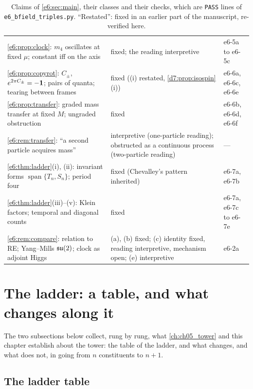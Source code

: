 \begin{table}[htbp]
\begin{tabular}{@{}>{\raggedright\arraybackslash}p{8.0cm}>{\raggedright\arraybackslash}p{4.7cm}>{\raggedright\arraybackslash}p{2.1cm}@{}}
\cref{e6:prop:clock}: $m_4$ oscillates at fixed $\mu$; constant iff on the axis & fixed; the reading interpretive & e6-5a to e6-5c\\
\cref{e6:prop:copyrot}: $C_\pm$, $e^{2\pi C_\pm}=-\mathbf 1$; pairs of quanta; tearing between frames & fixed ((i) restated, \cref{d7:prop:isospin}(i)) & e6-6a, e6-6c, e6-6e\\
\cref{e6:prop:transfer}: graded mass transfer at fixed $M$; ungraded obstruction & fixed & e6-6b, e6-6d, e6-6f\\
\cref{e6:rem:transfer}: ``a second particle acquires mass'' & interpretive (one-particle reading); obstructed as a continuous process (two-particle reading) & ---\\
\cref{e6:thm:ladder}(i), (ii): invariant forms $\operatorname{span}\{T_n,S_n\}$; period four & fixed (Chevalley's pattern inherited) & e6-7a, e6-7b\\
\cref{e6:thm:ladder}(iii)--(v): Klein factors; temporal and diagonal counts & fixed & e6-7a, e6-7c to e6-7e\\
\cref{e6:rem:compare}: relation to RE; Yang--Mills $\mathfrak{su}(2)$; clock as adjoint Higgs & (a), (b) fixed; (c) identity fixed, reading interpretive, mechanism open; (e) interpretive & e6-2a\\
\bottomrule
\end{tabular}
\caption{Claims of \cref{e6:sec:main}, their classes and their checks, which are \texttt{PASS} lines of \texttt{e6\_bfield\_triples.py}. ``Restated'': fixed in an earlier part of the manuscript, re-verified here.}
\label{e6:tab:claims}
\end{table}


\section{The ladder: a table, and what changes along it}
\label{sec:ladder}

The two subsections below collect, rung by rung, what \cref{ch:ch05_tower} and this chapter establish about the tower: the table of the
ladder, and what changes, and what does not, in going from $n$ constituents to $n+1$.

\subsection{The ladder table}
\label{e3:sec:table}

